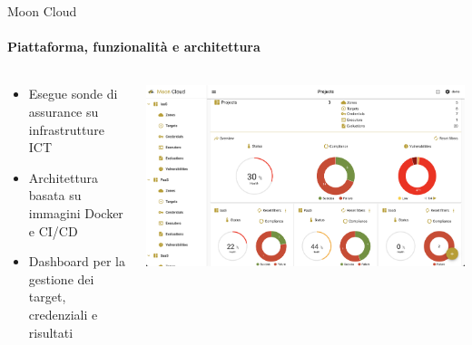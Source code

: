 \documentclass{beamer}
\begin{document}
\begin{frame}{Moon Cloud}
    \framesubtitle{Piattaforma, funzionalità e architettura}
    \begin{columns}
        \begin{column}{0.4\textwidth}
            \begin{itemize}
                \item<1-> Esegue sonde di assurance su infrastrutture ICT
                \item<2-> Architettura basata su immagini Docker e CI/CD
                \item<3-> Dashboard per la gestione dei target, credenziali e risultati
            \end{itemize}
        \end{column}
        \begin{column}{0.6\textwidth}
            \includegraphics[width=\textwidth]{assets/dashboad.png}
        \end{column}
    \end{columns}
\end{frame}
\end{document}
